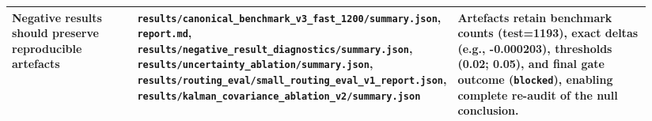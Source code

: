 \begin{table}[t]
\begin{tabular}{p{0.23\linewidth}p{0.32\linewidth}p{0.39\linewidth}}
\midrule
Negative results should preserve reproducible artefacts & \texttt{results/canonical\_benchmark\_v3\_fast\_1200/summary.json}, \texttt{report.md}, \texttt{results/negative\_result\_diagnostics/summary.json}, \texttt{results/uncertainty\_ablation/summary.json}, \texttt{results/routing\_eval/small\_routing\_eval\_v1\_report.json}, \texttt{results/kalman\_covariance\_ablation\_v2/summary.json} & Artefacts retain benchmark counts (test=1193), exact deltas (e.g., -0.000203), thresholds (0.02; 0.05), and final gate outcome (\texttt{blocked}), enabling complete re-audit of the null conclusion. \\
\bottomrule
\end{tabular}
\end{table}
